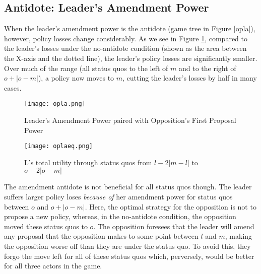 \documentclass[12pt]{article}
\theoremstyle{plain}		      \newtheorem{assn}{Assumption}
\theoremstyle{plain}		      \newtheorem{prop}{Proposition}
\theoremstyle{plain}		      \newtheorem{lemma}{Lemma}
\theoremstyle{plain}	          \newtheorem{imp}{Implication}
\theoremstyle{plain}	          \newtheorem{hyp}{Hypothesis}
\theoremstyle{definition}		  \newtheorem{defn}{Definition}
\theoremstyle{remark}	          \newtheorem{rem}{Remark}
\theoremstyle{definition}         \newtheorem{case}{Case}
\begin{document}
\subsection{Antidote: Leader's Amendment Power}
\indent When the leader's amendment power is the antidote (game tree in Figure \ref{opla}), however, policy losses change considerably. As we see in Figure \ref{oplaeq}, compared to the leader's losses under the no-antidote condition (shown as the area between the X-axis and the dotted line), the leader's policy losses are significantly smaller. Over much of the range (all status quos to the left of $m$ and to the right of $o+|o-m|$), a policy now moves to $m$, cutting the leader's losses by half in many cases. 
\begin{figure}[h]
  \centering
  \begin{minipage}[b]{0.3\textwidth}
    \texttt{[image: opla.png]}
    \caption{Leader's Amendment Power paired with Opposition's First Proposal Power}
    \label{opla}
  \end{minipage}
  \hfill
  \begin{minipage}[b]{0.6\textwidth}
    \texttt{[image: oplaeq.png]}
    \caption{L's total utility through status quos from \newline $l-2|m-l|$ to $o+2|o-m|$}
    \label{oplaeq}
  \end{minipage}
\end{figure}
\FloatBarrier

\indent The amendment antidote is not beneficial for all status quos though. The leader suffers larger policy loses \textit{because of} her amendment power for status quos between $o$ and $o+|o-m|$. Here, the optimal strategy for the opposition is not to propose a new policy, whereas, in the no-antidote condition, the opposition moved these status quos to $o$. The opposition foresees that the leader will amend any proposal that the opposition makes to some point between $l$ and $m$, making the opposition worse off than they are under the status quo. To avoid this, they forgo the move left for all of these status quos which, perversely, would be better for all three actors in the game. 
\end{document}
